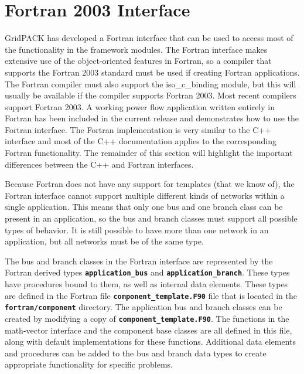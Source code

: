 \chapter{Fortran 2003 Interface}

GridPACK has developed a Fortran interface that can be used to access most of the functionality in the framework modules. The Fortran interface makes extensive use of the object-oriented features in Fortran, so a compiler that supports the Fortran 2003 standard must be used if creating Fortran applications. The Fortran compiler must also support the iso\_c\_binding module, but this will usually be available if the compiler supports Fortran 2003. Most recent compilers support Fortran 2003. A working power flow application written entirely in Fortran has been included in the current release and demonstrates how to use the Fortran interface. The Fortran implementation is very similar to the C++ interface and most of the C++ documentation applies to the corresponding Fortran functionality. The remainder of this section will highlight the important differences between the C++ and Fortran interfaces.

Because Fortran does not have any support for templates (that we know of), the Fortran interface cannot support multiple different kinds of networks within a single application. This means that only one bus and one branch class can be present in an application, so the bus and branch classes must support all possible types of behavior. It is still possible to have more than one network in an application, but all networks must be of the same type.

The bus and branch classes in the Fortran interface are represented by the Fortran derived types \texttt{\textbf{application\_bus}} and \texttt{\textbf{application\_branch}}. These types have procedures bound to them, as well as internal data elements. These types are defined in the Fortran file \texttt{\textbf{component\_template.F90}} file that is located in the \texttt{\textbf{fortran/component}} directory. The application bus and branch classes can be created by modifying a copy of \texttt{\textbf{component\_template.F90}}. The functions in the math-vector interface and the component base classes are all defined in this file, along with default implementations for these functions. Additional data elements and procedures can be added to the bus and branch data types to create appropriate functionality for specific problems.

